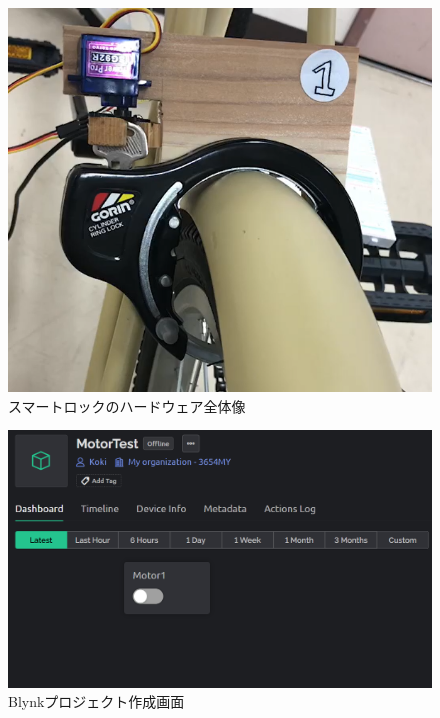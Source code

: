       \begin{figure}[htbp]
        \centering
        \includegraphics[scale=0.5]
        {figures/smartlock_hardware.png}
        \caption{スマートロックのハードウェア全体像}
        \label{fig:スマートロックのハードウェア全体像}
      \end{figure}
      
      \begin{figure}[htbp]
        \centering
        \includegraphics[scale=0.25]
        {figures/BlynkProject.png}
        \caption{Blynkプロジェクト作成画面}
        \label{fig:Blynkプロジェクト作成画面}
      \end{figure}
      
